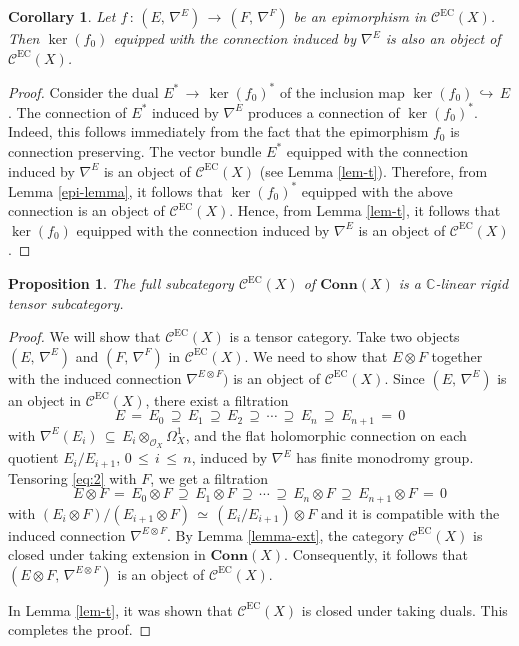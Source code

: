 \documentclass[12pt]{amsart}
\newtheorem{proposition}[theorem]{Proposition}
\newtheorem{corollary}[theorem]{Corollary}
\theoremstyle{definition}
\numberwithin{equation}{section}
\newcommand{\C}{\mathbb{C}}
\newcommand{\EC}{\mathcal{C}^\mathrm{EC}}
\begin{document}
\begin{corollary}\label{cor1}
Let $f\,:\, (E,\, \nabla^E) \,\longrightarrow\, (F,\, \nabla^F)$ be an epimorphism in 
$\EC(X)$. Then $\ker(f_0)$ equipped with the connection induced by $\nabla^E$ is
also an object of $\EC(X)$.
\end{corollary}

\begin{proof}
Consider the dual $E^*\, \longrightarrow\, \ker (f_0)^*$ of the inclusion map
$\ker(f_0) \, \hookrightarrow\, E$. The connection of $E^*$ induced by $\nabla^E$ produces a
connection of $\ker(f_0)^*$. Indeed, this follows immediately from the fact that the epimorphism
$f_0$ is connection preserving. The vector bundle $E^*$ equipped with the connection induced by
$\nabla^E$ is an object of $\EC(X)$ (see Lemma \ref{lem-t}). Therefore, from Lemma \ref{epi-lemma},
it follows that $\ker(f_0)^*$ equipped with the above connection is an object of $\EC(X)$. 
Hence, from Lemma \ref{lem-t}, it follows that $\ker(f_0)$ equipped with the connection induced 
by $\nabla^E$ is an object of $\EC(X)$.
\end{proof}

\begin{proposition}\label{prop-EC-rigid}
The full subcategory $\EC(X)$ of $\mathbf{Conn}(X)$ is a $\C$-linear rigid tensor subcategory. 
\end{proposition}

\begin{proof}
We will show that $\EC(X)$ is a tensor category. Take two objects $(E,\, \nabla^E)$ and
$(F,\, \nabla^F)$ in $\EC(X)$. We need to show that $E \otimes F$ together with the induced 
connection $\nabla^{E\otimes F})$ is an object of $\EC(X)$. 
Since $(E,\, \nabla^E)$ is an object in $\EC(X)$, there exist a filtration
\begin{equation}\label{eq:2}
E\,=\,E_0\,\supseteq\, E_1\, \supseteq\, E_2\, \supseteq\, \cdots\, \supseteq\, E_n\,\supseteq\, 
E_{n+1}\, =\, 0
\end{equation}
with $\nabla^E(E_i)\, \subseteq\, E_i \otimes_{\mathcal{O}_X} \Omega_X^1$, and the flat holomorphic
connection on each quotient $E_i/E_{i+1}$, $0\, \leq\, i\, \leq\, n$, induced by $\nabla^E$ 
has finite monodromy group. Tensoring \eqref{eq:2} with $F$, we get a filtration 
$$
E\otimes F\,=\,E_0\otimes F\,\supseteq\, E_1\otimes F\, \supseteq\, \cdots\, \supseteq\,
E_n\otimes F\,\supseteq\, E_{n+1}\otimes F\, =\, 0
$$ 
with $(E_i \otimes F)/(E_{i+1} \otimes F)\, \simeq\, (E_i/E_{i+1})\otimes F$ and it is compatible 
with the induced connection $\nabla^{E\otimes F}$. By Lemma \ref{lemma-ext}, the 
category $\EC(X)$ is closed under taking extension in $\mathbf{Conn}(X)$. Consequently, it follows 
that $(E \otimes F,\, \nabla^{E\otimes F})$ is an object of $\EC(X)$. 

In Lemma \ref{lem-t}, it was shown that $\EC(X)$ is closed under taking duals. This completes the proof.
\end{proof}
\end{document}
